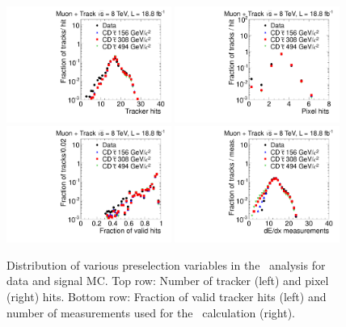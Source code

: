 \begin{figure}
\centering
  \includegraphics[clip=false, trim=0.0cm 0cm 0.0cm 0cm, width=0.48\textwidth]{figures/tkmu/Selection_Comp_8TeV_GMStau_NOH_BS}
  \includegraphics[clip=false, trim=0.0cm 0cm 0.0cm 0cm, width=0.48\textwidth]{figures/tkmu/Selection_Comp_8TeV_GMStau_NOPH_BS} \\
  \includegraphics[clip=false, trim=0.0cm 0cm 0.0cm 0cm, width=0.48\textwidth]{figures/tkmu/Selection_Comp_8TeV_GMStau_NOHFraction_BS}
  \includegraphics[clip=false, trim=0.0cm 0cm 0.0cm 0cm, width=0.48\textwidth]{figures/tkmu/Selection_Comp_8TeV_GMStau_NOM_BS}
  \caption[Distribution of number of tracker and pixel hits, fraction of valid tracker hits, and number of \dedx\ measurements in the \tktof\ analysis for data and signal MC.]
{Distribution of various preselection variables in the \tktof\ analysis for data and signal MC.
Top row: Number of tracker (left) and pixel (right) hits.
Bottom row: Fraction of valid tracker hits (left) and number of measurements used for the \dedx\ calculation (right).}
    \label{fig:TkMuPreselA}
\end{figure}


